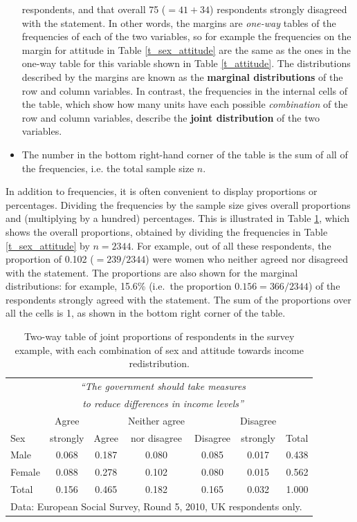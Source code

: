\begin{itemize}
respondents, and that overall 75 ($=41+34$) respondents strongly
disagreed with the statement. In other words, the margins are
\emph{one-way} tables of the frequencies of each of the two variables,
so for example the frequencies on the margin for attitude
in Table \ref{t_sex_attitude} are the same as the ones in the one-way
table for this variable shown in Table \ref{t_attitude}.
The distributions described by the margins
are known as the \textbf{marginal distributions} of the row and column
variables. In contrast, the frequencies in the internal cells of the
table, which show how many units have each possible
\emph{combination} of the row and column variables, describe the \textbf{joint
distribution} of the two variables.
\item
The number in the bottom
right-hand corner of the table is the sum of all of the frequencies,
i.e. the total sample size $n$.
\end{itemize}

In addition to frequencies, it is often convenient to display
proportions or percentages. Dividing the frequencies by the sample size
gives overall proportions and (multiplying by a hundred) percentages.
This is illustrated in Table \ref{t_sex_attitude_pr}, which shows the
overall proportions, obtained by dividing the frequencies in Table
\ref{t_sex_attitude} by $n=2344$. For example,
out of all these
respondents, the proportion of 0.102 ($=239/2344$)
were women who neither agreed nor disagreed
with the statement. The proportions are also
shown for the marginal distributions: for example, 15.6\% (i.e.\ the
proportion $0.156=366/2344$) of the respondents strongly agreed with the
statement. The sum of the proportions over all the cells is 1, as shown
in the bottom right corner of the table.

\begin{table}
\caption{Two-way table of joint proportions of respondents in the survey example,
with each combination of sex and attitude towards income redistribution.}
\label{t_sex_attitude_pr}
\begin{center}
\begin{tabular}{|l|ccccc|r|}\hline
& \multicolumn{5}{|c|}{\emph{``The government should
take measures}} & \\
& \multicolumn{5}{|c|}{\emph{to reduce differences in income levels''}}
& \\
 & Agree & & Neither agree & & Disagree & \\
Sex & strongly & Agree & nor disagree & Disagree & strongly & Total \\ \hline
Male &  0.068& 0.187 & 0.080 &0.085  & 0.017& 0.438 \\
Female & 0.088 & 0.278 & 0.102 & 0.080 & 0.015 & 0.562\\
\hline
Total & 0.156 & 0.465 & 0.182 & 0.165& 0.032 & 1.000 \\
\hline
\multicolumn{7}{l}{\scriptsize Data: European Social Survey, Round 5,
2010, UK respondents only.}
\end{tabular}
\end{center}

\end{table}

